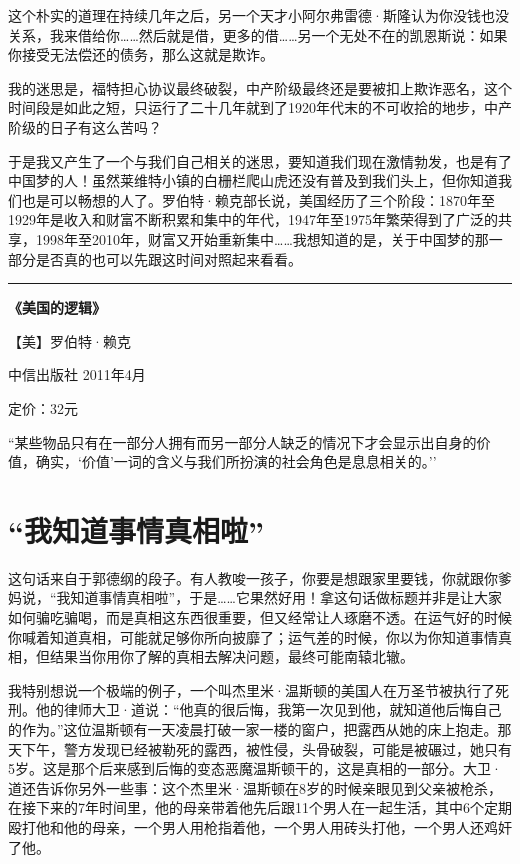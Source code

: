 这个朴实的道理在持续几年之后，另一个天才小阿尔弗雷德·斯隆认为你没钱也没关系，我来借给你\ldots{}\ldots{}然后就是借，更多的借\ldots{}\ldots{}另一个无处不在的凯恩斯说：如果你接受无法偿还的债务，那么这就是欺诈。

我的迷思是，福特担心协议最终破裂，中产阶级最终还是要被扣上欺诈恶名，这个时间段是如此之短，只运行了二十几年就到了1920年代末的不可收拾的地步，中产阶级的日子有这么苦吗？

于是我又产生了一个与我们自己相关的迷思，要知道我们现在激情勃发，也是有了中国梦的人！虽然莱维特小镇的白栅栏爬山虎还没有普及到我们头上，但你知道我们也是可以畅想的人了。罗伯特·赖克部长说，美国经历了三个阶段：1870年至1929年是收入和财富不断积累和集中的年代，1947年至1975年繁荣得到了广泛的共享，1998年至2010年，财富又开始重新集中\ldots{}\ldots{}我想知道的是，关于中国梦的那一部分是否真的也可以先跟这时间对照起来看看。

\begin{center}\rule{3in}{0.4pt}\end{center}

\textbf{《美国的逻辑》}

【美】罗伯特·赖克

中信出版社 2011年4月

定价：32元

``某些物品只有在一部分人拥有而另一部分人缺乏的情况下才会显示出自身的价值，确实，`价值'一词的含义与我们所扮演的社会角色是息息相关的。''

\section{``我知道事情真相啦''}

这句话来自于郭德纲的段子。有人教唆一孩子，你要是想跟家里要钱，你就跟你爹妈说，``我知道事情真相啦''，于是\ldots{}\ldots{}它果然好用！拿这句话做标题并非是让大家如何骗吃骗喝，而是真相这东西很重要，但又经常让人琢磨不透。在运气好的时候你喊着知道真相，可能就足够你所向披靡了；运气差的时候，你以为你知道事情真相，但结果当你用你了解的真相去解决问题，最终可能南辕北辙。

我特别想说一个极端的例子，一个叫杰里米·温斯顿的美国人在万圣节被执行了死刑。他的律师大卫·道说：``他真的很后悔，我第一次见到他，就知道他后悔自己的作为。''这位温斯顿有一天凌晨打破一家一楼的窗户，把露西从她的床上抱走。那天下午，警方发现已经被勒死的露西，被性侵，头骨破裂，可能是被碾过，她只有5岁。这是那个后来感到后悔的变态恶魔温斯顿干的，这是真相的一部分。大卫·道还告诉你另外一些事：这个杰里米·温斯顿在8岁的时候亲眼见到父亲被枪杀，在接下来的7年时间里，他的母亲带着他先后跟11个男人在一起生活，其中6个定期殴打他和他的母亲，一个男人用枪指着他，一个男人用砖头打他，一个男人还鸡奸了他。

